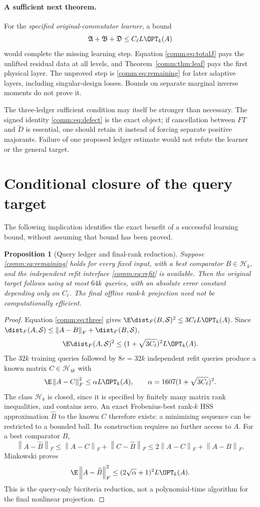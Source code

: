\documentclass[11pt,oneside,openany,a4paper]{book}
\numberwithin{equation}{chapter}
\newtheorem{proposition}[theorem]{Proposition}
\theoremstyle{definition}
\theoremstyle{remark}
\newcommand{\F}[1]{\left\lVert#1\right\rVert_F}
\newcommand{\HH}{\mathcal H}\newcommand{\SSS}{\mathcal S}
\begin{document}
\paragraph{A sufficient next theorem.}
For the \emph{specified original-commutator learner}, a bound
\begin{equation}\label{comm:eq:remaining}
 \mathfrak A+\mathfrak B+\mathfrak D\le C_\ell L\OPT_k(A)
\end{equation}
would complete the missing learning step. Equation \eqref{comm:eq:totalJ} pays the unlifted residual data at all levels, and Theorem~\ref{comm:thm:leaf} pays the first physical layer. The unproved step is \eqref{comm:eq:remaining} for later adaptive layers, including singular-design losses. Bounds on separate marginal inverse moments do not prove it.

The three-ledger sufficient condition may itself be stronger than necessary. The signed identity \eqref{comm:eq:defect} is the exact object; if cancellation between $FT$ and $\widetilde D$ is essential, one should retain it instead of forcing separate positive majorants. Failure of one proposed ledger estimate would not refute the learner or the general target.

\section{Conditional closure of the query target}
The following implication identifies the exact benefit of a successful learning bound, without assuming that bound has been proved.

\begin{proposition}[Query ledger and final-rank reduction]\label{comm:prop:conditional}
Suppose \eqref{comm:eq:remaining} holds for every fixed input, with a best comparator $B\in\HH_k$, and the independent refit interface \eqref{comm:eq:refit} is available. Then the original target follows using at most $64k$ queries, with an absolute error constant depending only on $C_\ell$. The final offline rank-$k$ projection need not be computationally efficient.
\end{proposition}
\begin{proof}
Equation \eqref{comm:eq:three} gives $\E\dist_F(B,\SSS)^2\le3C_\ell L\OPT_k(A)$. Since $\dist_F(A,\SSS)\le\F{A-B}+\dist_F(B,\SSS)$,
\[
 \E\dist_F(A,\SSS)^2\le(1+\sqrt{3C_\ell})^2L\OPT_k(A).
\]
The $32k$ training queries followed by $8r=32k$ independent refit queries produce a known matrix $C\in\HH_{4k}$ with
\[
 \E\F{A-C}^2\le\alpha L\OPT_k(A),\qquad
 \alpha=1607(1+\sqrt{3C_\ell})^2.
\]
The class $\HH_k$ is closed, since it is specified by finitely many matrix rank inequalities, and contains zero. An exact Frobenius-best rank-$k$ HSS approximation $\widehat B$ to the known $C$ therefore exists: a minimizing sequence can be restricted to a bounded ball. Its construction requires no further access to $A$. For a best comparator $B$,
\[
 \F{A-\widehat B}\le\F{A-C}+\F{C-\widehat B}
 \le2\F{A-C}+\F{A-B}.
\]
Minkowski proves
\[
 \E\F{A-\widehat B}^2\le(2\sqrt\alpha+1)^2L\OPT_k(A).
\]
This is the query-only bicriteria reduction, not a polynomial-time algorithm for the final nonlinear projection.
\end{proof}
\end{document}
